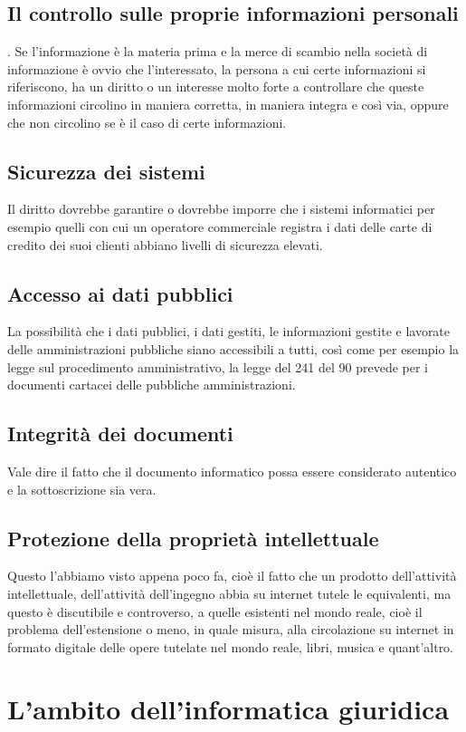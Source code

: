 \subsection{Il controllo sulle proprie informazioni personali}.
Se l'informazione è la materia prima e la merce di scambio nella società di informazione è ovvio che l'interessato, la persona a cui certe informazioni si riferiscono, ha un diritto o un interesse molto forte a controllare che queste informazioni circolino in maniera corretta, in maniera integra e così via, oppure che non circolino se è il caso di certe informazioni. 
\subsection{Sicurezza dei sistemi}
Il diritto dovrebbe garantire o dovrebbe imporre che i sistemi informatici per esempio quelli con cui un operatore commerciale registra i dati delle carte di credito dei suoi clienti abbiano livelli di sicurezza elevati. 
\subsection{Accesso ai dati pubblici}
La possibilità che i dati pubblici, i dati gestiti, le informazioni gestite e lavorate delle amministrazioni pubbliche siano accessibili a tutti, così come per esempio la legge sul procedimento amministrativo, la legge del 241 del 90 prevede per i documenti cartacei delle pubbliche amministrazioni. 
\subsection{Integrità dei documenti} Vale dire il fatto che il documento informatico possa essere considerato autentico e la sottoscrizione sia vera. 
\subsection{Protezione della proprietà intellettuale} 
Questo l'abbiamo visto appena poco fa, cioè il fatto che un prodotto dell'attività intellettuale, dell'attività dell'ingegno abbia su internet tutele le equivalenti, ma questo è discutibile e controverso, a quelle esistenti nel mondo reale, cioè il problema dell'estensione o meno, in quale misura, alla circolazione su internet in formato digitale delle opere tutelate nel mondo reale, libri, musica e quant'altro. 

\section{L'ambito dell'informatica giuridica}


